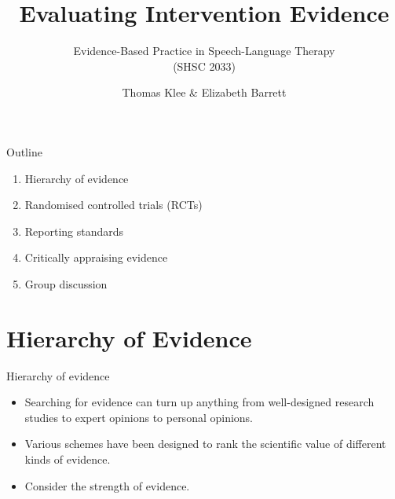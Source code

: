 \documentclass{beamer}
\title{Evaluating Intervention Evidence}
\subtitle{}
\author{Evidence-Based Practice in Speech-Language Therapy \\ (SHSC 2033)}
\institute{Session 3}
\date{Thomas Klee \& Elizabeth Barrett}
\begin{document}
\begin{frame}
	\titlepage
\end{frame}

% 
\begin{frame}{Outline}
	\begin{enumerate}
	\item Hierarchy of evidence
	\item Randomised controlled trials (RCTs)
	\item Reporting standards
	\item Critically appraising evidence
	\item Group discussion
	\end {enumerate}
\end{frame}

\section*{Hierarchy of Evidence}

%
\begin{frame}
\center{\Huge{\textcolor{darkgray}{Hierarchy of Evidence}}}
\end{frame}

% 
\begin{frame}{Hierarchy of evidence}
	\begin{itemize}
	\item Searching for evidence can turn up anything from well-designed research studies to expert opinions to personal opinions.
	\item Various schemes have been designed to rank the scientific value of different kinds of evidence.
	\item Consider the strength of evidence.
	\end {itemize}
\end{frame}
\end{document}
